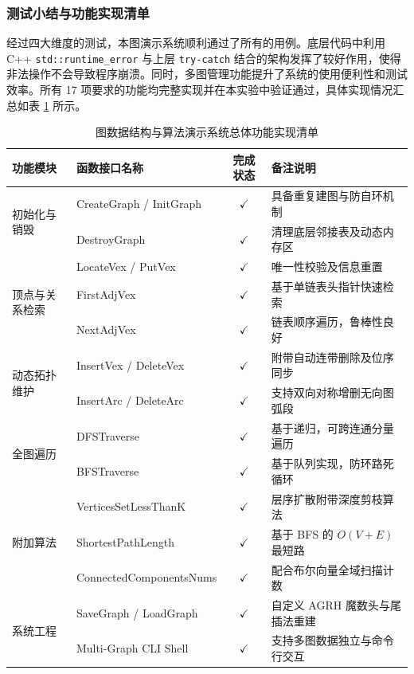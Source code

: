\documentclass[supercite]{Experimental_Report}
\theoremstyle{definition}
\begin{document}
\subsubsection{测试小结与功能实现清单}
经过四大维度的测试，本图演示系统顺利通过了所有的用例。底层代码中利用 C++ \texttt{std::runtime\_error} 与上层 \texttt{try-catch} 结合的架构发挥了较好作用，使得非法操作不会导致程序崩溃。同时，多图管理功能提升了系统的使用便利性和测试效率。所有 17 项要求的功能均完整实现并在本实验中验证通过，具体实现情况汇总如表 \ref{tab:feature_status} 所示。


\begin{table}[htbp]
	\centering
	\caption{图数据结构与算法演示系统总体功能实现清单}
	\vspace{0.5em}
	\setlength{\tabcolsep}{4pt}
	\renewcommand{\arraystretch}{1.15}
	\begin{tabular}{|l|l|c|p{5.2cm}|}
		\hline
		\textbf{功能模块} & \textbf{函数接口名称} & \textbf{完成状态} & \textbf{备注说明} \\ \hline
		\multirow{2}{*}{初始化与销毁} 
		& CreateGraph / InitGraph & $\checkmark$ & 具备重复建图与防自环机制 \\ \cline{2-4}
		& DestroyGraph & $\checkmark$ & 清理底层邻接表及动态内存区 \\ \hline
		
		\multirow{3}{*}{顶点与关系检索} 
		& LocateVex / PutVex & $\checkmark$ & 唯一性校验及信息重置 \\ \cline{2-4}
		& FirstAdjVex & $\checkmark$ & 基于单链表头指针快速检索 \\ \cline{2-4}
		& NextAdjVex & $\checkmark$ & 链表顺序遍历，鲁棒性良好 \\ \hline
		
		\multirow{2}{*}{动态拓扑维护} 
		& InsertVex / DeleteVex & $\checkmark$ & 附带自动连带删除及位序同步 \\ \cline{2-4}
		& InsertArc / DeleteArc & $\checkmark$ & 支持双向对称增删无向图弧段 \\ \hline
		
		\multirow{2}{*}{全图遍历} 
		& DFSTraverse & $\checkmark$ & 基于递归，可跨连通分量遍历 \\ \cline{2-4}
		& BFSTraverse & $\checkmark$ & 基于队列实现，防环路死循环 \\ \hline
		
		\multirow{3}{*}{附加算法} 
		& VerticesSetLessThanK & $\checkmark$ & 层序扩散附带深度剪枝算法 \\ \cline{2-4}
		& ShortestPathLength & $\checkmark$ & 基于 BFS 的 $O(V+E)$ 最短路 \\ \cline{2-4}
		& ConnectedComponentsNums & $\checkmark$ & 配合布尔向量全域扫描计数 \\ \hline
		
		\multirow{2}{*}{系统工程} 
		& SaveGraph / LoadGraph & $\checkmark$ & 自定义 AGRH 魔数头与尾插法重建 \\ \cline{2-4}
		& Multi-Graph CLI Shell & $\checkmark$ & 支持多图数据独立与命令行交互 \\ \hline
	\end{tabular}
	\label{tab:feature_status}
\end{table}
\end{document}

